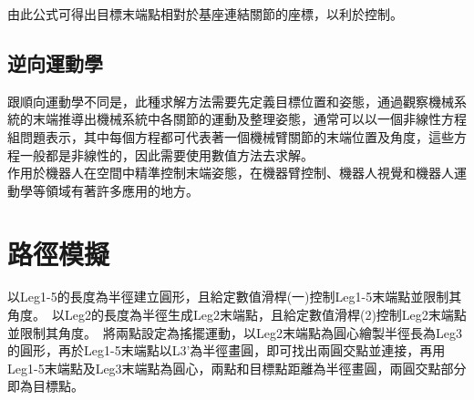 由此公式可得出目標末端點相對於基座連結關節的座標，以利於控制。\\

\subsection{逆向運動學}
跟順向運動學不同是，此種求解方法需要先定義目標位置和姿態，通過觀察機械系統的末端推導出機械系統中各關節的運動及整理姿態，通常可以以一個非線性方程組問題表示，其中每個方程都可代表著一個機械臂關節的末端位置及角度，這些方程一般都是非線性的，因此需要使用數值方法去求解。\\
作用於機器人在空間中精準控制末端姿態，在機器臂控制、機器人視覺和機器人運動學等領域有著許多應用的地方。\\

\section{路徑模擬}
以Leg1-5的長度為半徑建立圓形，且給定數值滑桿(一)控制Leg1-5末端點並限制其角度。\
以Leg2的長度為半徑生成Leg2末端點，且給定數值滑桿(2)控制Leg2末端點並限制其角度。\
將兩點設定為搖擺運動，以Leg2末端點為圓心繪製半徑長為Leg3的圓形，再於Leg1-5末端點以L3’為半徑畫圓，即可找出兩圓交點並連接，再用Leg1-5末端點及Leg3末端點為圓心，兩點和目標點距離為半徑畫圓，兩圓交點部分即為目標點。
\newpage
